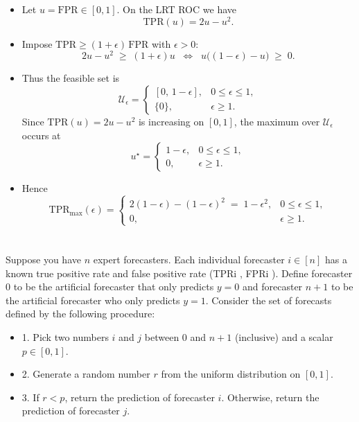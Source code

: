 \documentclass[a4paper]{article}
\begin{document}
\begin{itemize}
            \begin{itemize}
                \item Let $u=\mathrm{FPR}\in[0,1]$. On the LRT ROC we have
            \[
            \mathrm{TPR}(u)=2u-u^2.
            \]
                \item Impose $\mathrm{TPR}\ge(1+\epsilon)\,\mathrm{FPR}$ with $\epsilon>0$:
            \[
            2u-u^2 \;\ge\; (1+\epsilon)u
            \;\;\Longleftrightarrow\;\;
            u\big((1-\epsilon)-u\big)\;\ge\;0.
            \]
                \item Thus the feasible set is
            \[
            \mathcal{U}_\epsilon=
            \begin{cases}
            [0,\,1-\epsilon], & 0\le \epsilon\le 1,\\
            \{0\}, & \epsilon\ge 1.
            \end{cases}
            \]
            Since $\mathrm{TPR}(u)=2u-u^2$ is increasing on $[0,1]$, the maximum over $\mathcal{U}_\epsilon$ occurs at
            \[
            u^\star =
            \begin{cases}
            1-\epsilon, & 0\le \epsilon\le 1,\\
            0, & \epsilon\ge 1.
            \end{cases}
            \]
                \item Hence
            \[
            \boxed{\;
            \mathrm{TPR}_{\max}(\epsilon)=
            \begin{cases}
            2(1-\epsilon)-(1-\epsilon)^2 \;=\; 1-\epsilon^2, & 0\le \epsilon\le 1,\\[3pt]
            0, & \epsilon\ge 1.
            \end{cases}
            \;}
            \]
            \end{itemize}
    \end{itemize}

\section{}

Suppose you have $n$ expert forecasters.
Each individual forecaster $i \in [n]$ has a known true positive rate and false positive rate (TPRi , FPRi ).
Define forecaster 0 to be the artificial forecaster that only predicts $y = 0$ and forecaster $n + 1$ to be the artificial forecaster who only predicts $y = 1$.
Consider the set of forecasts defined by the following procedure:
\begin{itemize}
    \item 1. Pick two numbers $i$ and $j$ between $0$ and $n + 1$ (inclusive) and a scalar $p \in [0, 1]$.
    \item 2. Generate a random number $r$ from the uniform distribution on $[0, 1]$.
    \item 3. If $r < p$, return the prediction of forecaster $i$. Otherwise, return the prediction of forecaster $j$.
\end{itemize}
\end{document}
